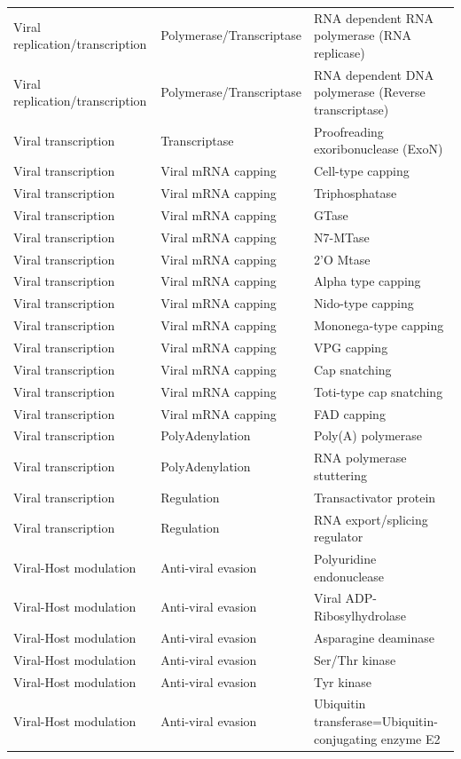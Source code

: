 \documentclass[
  sn-nature,
]{sn-jnl}
\newcounter{none} %
\begin{document}
\begin{longtable}{lll}
Viral replication/transcription & Polymerase/Transcriptase & RNA dependent RNA polymerase (RNA replicase)\\
Viral replication/transcription & Polymerase/Transcriptase & RNA dependent DNA polymerase (Reverse transcriptase)\\
Viral transcription & Transcriptase & Proofreading exoribonuclease (ExoN)\\
Viral transcription & Viral mRNA capping & Cell-type capping\\
Viral transcription & Viral mRNA capping & Triphosphatase\\
Viral transcription & Viral mRNA capping & GTase\\
Viral transcription & Viral mRNA capping & N7-MTase\\
Viral transcription & Viral mRNA capping & 2'O Mtase\\
Viral transcription & Viral mRNA capping & Alpha type capping\\
Viral transcription & Viral mRNA capping & Nido-type capping\\
Viral transcription & Viral mRNA capping & Mononega-type capping\\
Viral transcription & Viral mRNA capping & VPG capping\\
Viral transcription & Viral mRNA capping & Cap snatching\\
Viral transcription & Viral mRNA capping & Toti-type cap snatching\\
Viral transcription & Viral mRNA capping & FAD capping\\
Viral transcription & PolyAdenylation & Poly(A) polymerase\\
Viral transcription & PolyAdenylation & RNA polymerase stuttering\\
Viral transcription & Regulation & Transactivator protein\\
Viral transcription & Regulation & RNA export/splicing regulator\\
Viral-Host modulation & Anti-viral evasion & Polyuridine endonuclease\\
Viral-Host modulation & Anti-viral evasion & Viral ADP-Ribosylhydrolase\\
Viral-Host modulation & Anti-viral evasion & Asparagine deaminase\\
Viral-Host modulation & Anti-viral evasion & Ser/Thr kinase\\
Viral-Host modulation & Anti-viral evasion & Tyr kinase\\
Viral-Host modulation & Anti-viral evasion & Ubiquitin transferase=Ubiquitin-conjugating enzyme E2\\

\end{longtable}
\end{document}
